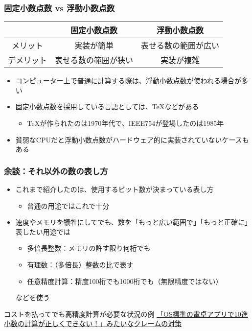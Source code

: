 \documentclass[aspectratio=169]{beamer}
\begin{document}
\begin{frame}\frametitle{固定小数点数 vs 浮動小数点数}
  \begin{center}
    \begin{tabular}{c|c|c}
      & 固定小数点数 & 浮動小数点数 \\ \hline
      メリット & 実装が簡単 & 表せる数の範囲が広い \\ \hline
      デメリット & 表せる数の範囲が狭い & 実装が複雑
    \end{tabular}
  \end{center}

  \begin{itemize}
  \item コンピューター上で普通に計算する際は、浮動小数点数が使われる場合が多い
  \item 固定小数点数を採用している言語としては、\TeX などがある
    \begin{itemize}
    \item \TeX が作られたのは1970年代で、IEEE754が登場したのは1985年
    \end{itemize}
  \item 貧弱なCPUだと浮動小数点数がハードウェア的に実装されていないケースもある
  \end{itemize}
\end{frame}

\begin{frame}\frametitle{余談：それ以外の数の表し方}
  \begin{itemize}
  \item これまで紹介したのは、使用するビット数が決まっている表し方
    \begin{itemize}
    \item 普通の用途ではこれで十分
    \end{itemize}
  \item 速度やメモリを犠牲にしてでも、数を「もっと広い範囲で」「もっと正確に」表したい用途では
    \begin{itemize}
    \item 多倍長整数：メモリの許す限り何桁でも
    \item 有理数：（多倍長）整数の比で表す
    \item 任意精度計算：精度100桁でも1000桁でも（無限精度ではない）
    \end{itemize}
    などを使う
  \end{itemize}
  \begin{exampleblock}{コストを払ってでも高精度計算が必要な状況の例}
    \href{https://blogs.msdn.microsoft.com/oldnewthing/20040525-00/?p=39193/}{「OS標準の電卓アプリで10進小数の計算が正しくできない！」みたいなクレームの対策}
  \end{exampleblock}
\end{frame}
\end{document}
